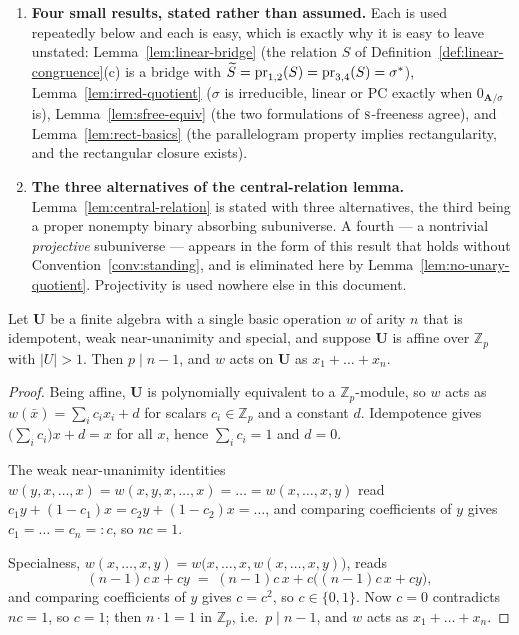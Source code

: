 \begin{enumerate}
\item\label{leg:notice}\textbf{Four small results, stated rather than assumed.}
Each is used repeatedly below and each is easy, which is exactly why it is
easy to leave unstated: Lemma~\ref{lem:linear-bridge} (the relation $S$ of
Definition~\ref{def:linear-congruence}(c) is a bridge with
$\widetilde{S}=\operatorname*{pr}_{1,2}(S)=\operatorname*{pr}_{3,4}(S)=\sigma^{*}$),
Lemma~\ref{lem:irred-quotient} ($\sigma$ is irreducible, linear or PC exactly
when $0_{\mathbf A/\sigma}$ is), Lemma~\ref{lem:sfree-equiv} (the two
formulations of $\textup{\textsc{s}}$-freeness agree), and Lemma~\ref{lem:rect-basics} (the
parallelogram property implies rectangularity, and the rectangular closure
exists).

\item\label{leg:central}\textbf{The three alternatives of the central-relation
lemma.} Lemma~\ref{lem:central-relation} is stated with three alternatives, the
third being a proper nonempty binary absorbing subuniverse. A fourth ---
a nontrivial \emph{projective} subuniverse --- appears in the form of this
result that holds without Convention~\ref{conv:standing}, and is eliminated
here by Lemma~\ref{lem:no-unary-quotient}. Projectivity is used nowhere else in
this document.

\end{enumerate}

\begin{proposition}\label{prop:p-divides}
Let $\mathbf U$ be a finite algebra with a single basic operation $w$ of arity
$n$ that is idempotent, weak near-unanimity and special, and suppose
$\mathbf U$ is affine over $\mathbb Z_{p}$ with $|U|>1$. Then $p\mid n-1$, and
$w$ acts on $\mathbf U$ as $x_{1}+\dots+x_{n}$.
\end{proposition}

\begin{proof}
Being affine, $\mathbf U$ is polynomially equivalent to a
$\mathbb Z_{p}$-module, so $w$ acts as $w(\bar x)=\sum_{i}c_{i}x_{i}+d$ for
scalars $c_{i}\in\mathbb Z_{p}$ and a constant $d$. Idempotence gives
$\bigl(\sum_{i}c_{i}\bigr)x+d=x$ for all $x$, hence $\sum_{i}c_{i}=1$ and
$d=0$.

The weak near-unanimity identities
$w(y,x,\dots,x)=w(x,y,x,\dots,x)=\dots=w(x,\dots,x,y)$ read
$c_{1}y+(1-c_{1})x=c_{2}y+(1-c_{2})x=\dots$, and comparing coefficients of $y$
gives $c_{1}=\dots=c_{n}=:c$, so $nc=1$.

Specialness, $w(x,\dots,x,y)=w\bigl(x,\dots,x,w(x,\dots,x,y)\bigr)$, reads
\[
  (n-1)c\,x+cy \;=\; (n-1)c\,x+c\bigl((n-1)c\,x+cy\bigr),
\]
and comparing coefficients of $y$ gives $c=c^{2}$, so $c\in\{0,1\}$. Now $c=0$
contradicts $nc=1$, so $c=1$; then $n\cdot 1=1$ in $\mathbb Z_{p}$, i.e.\
$p\mid n-1$, and $w$ acts as $x_{1}+\dots+x_{n}$.
\end{proof}

